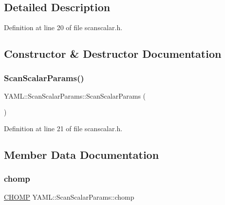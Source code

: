 \subsection{Detailed Description}


Definition at line 20 of file scanscalar.\+h.



\subsection{Constructor \& Destructor Documentation}
\mbox{\label{struct_y_a_m_l_1_1_scan_scalar_params_a2bdf208a85fef3fde0496e500a112787}} 
\subsubsection{\texorpdfstring{ScanScalarParams()}{ScanScalarParams()}}
{\footnotesize\ttfamily Y\+A\+M\+L\+::\+Scan\+Scalar\+Params\+::\+Scan\+Scalar\+Params (\begin{DoxyParamCaption}{ }\end{DoxyParamCaption})\hspace{0.3cm}{\ttfamily [inline]}}



Definition at line 21 of file scanscalar.\+h.



\subsection{Member Data Documentation}
\mbox{\label{struct_y_a_m_l_1_1_scan_scalar_params_adc66f6393010976d6e2848ffd22844b6}} 
\subsubsection{\texorpdfstring{chomp}{chomp}}
{\footnotesize\ttfamily \mbox{\hyperlink{namespace_y_a_m_l_ac13b04be586f671c9575454e6db6e843}{C\+H\+O\+MP}} Y\+A\+M\+L\+::\+Scan\+Scalar\+Params\+::chomp}




